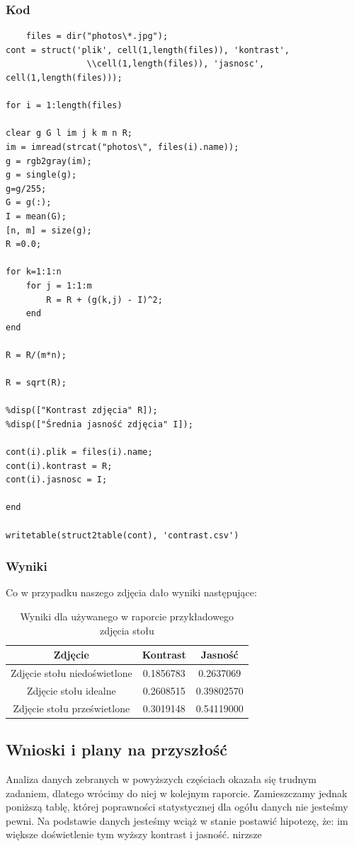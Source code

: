 \documentclass[options]{mwart}
\begin{document}
\subsubsection{Kod}
\begin{verbatim}
    files = dir("photos\*.jpg");
cont = struct('plik', cell(1,length(files)), 'kontrast',
                \\cell(1,length(files)), 'jasnosc', cell(1,length(files)));

for i = 1:length(files)

clear g G l im j k m n R;
im = imread(strcat("photos\", files(i).name)); 
g = rgb2gray(im);
g = single(g);
g=g/255;
G = g(:);
I = mean(G);
[n, m] = size(g);
R =0.0;

for k=1:1:n
    for j = 1:1:m
        R = R + (g(k,j) - I)^2;
    end
end

R = R/(m*n);

R = sqrt(R);

%disp(["Kontrast zdjęcia" R]);
%disp(["Średnia jasność zdjęcia" I]);

cont(i).plik = files(i).name;
cont(i).kontrast = R;
cont(i).jasnosc = I;

end

writetable(struct2table(cont), 'contrast.csv')

\end{verbatim}
\subsubsection{Wyniki}
Co w przypadku naszego zdjęcia dało wyniki następujące:

\begin{table}[h]
    \centering
    \begin{tabular}{|c|c|c|}
        \hline
        Zdjęcie                      & Kontrast  & Jasność    \\ \hline
        Zdjęcie stołu niedoświetlone & 0.1856783 & 0.2637069  \\ \hline
        Zdjęcie stołu idealne        & 0.2608515 & 0.39802570 \\ \hline
        Zdjęcie stołu prześwietlone  & 0.3019148 & 0.54119000 \\ \hline
    \end{tabular}
    \caption{Wyniki dla używanego w raporcie przykładowego zdjęcia stołu}
\end{table}

\newpage
\subsection{Wnioski i plany na przyszłość}
Analiza danych zebranych w powyższych częściach okazała się trudnym zadaniem,
dlatego wrócimy do niej w kolejnym raporcie. Zamieszczamy jednak poniższą tablę,
której poprawności statystycznej dla ogółu danych nie jesteśmy pewni. Na podstawie
danych jesteśmy wciąż w stanie postawić hipotezę, że: im większe doświetlenie tym
wyższy kontrast i jasność. nirzsze
\end{document}
